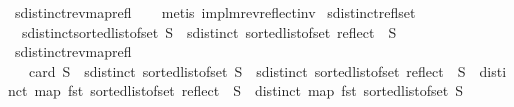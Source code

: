 \begin{isabellebody}
\ sdistinct{\isacharunderscore}{\kern0pt}rev{\isacharunderscore}{\kern0pt}map{\isacharunderscore}{\kern0pt}refl{}\isanewline
\ \ \isamarkupfalse%
\ {\isacharparenleft}{\kern0pt}metis\ implm{\isacharunderscore}{\kern0pt}rev{\isacharunderscore}{\kern0pt}reflect{\isacharunderscore}{\kern0pt}inv{\isacharparenright}{\kern0pt}%
\endisatagproof
{\isafoldproof}%
%
\isadelimproof
\isanewline
%
\endisadelimproof
\isanewline
{}\isamarkupfalse%
\ sdistinct{\isacharunderscore}{\kern0pt}refl{\isacharunderscore}{\kern0pt}set{\isacharcolon}{\kern0pt}\isanewline
\ \ {\isachardoublequoteopen}sdistinct{\isacharparenleft}{\kern0pt}sorted{\isacharunderscore}{\kern0pt}list{\isacharunderscore}{\kern0pt}of{\isacharunderscore}{\kern0pt}set\ S{\isacharparenright}{\kern0pt}\ {\isasymlongleftrightarrow}\ sdistinct\ {\isacharparenleft}{\kern0pt}sorted{\isacharunderscore}{\kern0pt}list{\isacharunderscore}{\kern0pt}of{\isacharunderscore}{\kern0pt}set\ {\isacharparenleft}{\kern0pt}reflect\ {\isacharbackquote}{\kern0pt}\ S{\isacharparenright}{\kern0pt}{\isacharparenright}{\kern0pt}{\isachardoublequoteclose}\isanewline
%
\isadelimproof
\ \ %
\endisadelimproof
%
\isatagproof
{}\isamarkupfalse%
\ sdistinct{\isacharunderscore}{\kern0pt}rev{\isacharunderscore}{\kern0pt}map{\isacharunderscore}{\kern0pt}refl\isanewline
{}\isamarkupfalse%
\ {\isacharminus}{\kern0pt}\isanewline
\ \ \isamarkupfalse%
\ {\isachardoublequoteopen}{}\ {\isacharequal}{\kern0pt}\ card\ S\ {\isasymlongrightarrow}\ sdistinct\ {\isacharparenleft}{\kern0pt}sorted{\isacharunderscore}{\kern0pt}list{\isacharunderscore}{\kern0pt}of{\isacharunderscore}{\kern0pt}set\ S{\isacharparenright}{\kern0pt}\ {\isacharequal}{\kern0pt}\ sdistinct\ {\isacharparenleft}{\kern0pt}sorted{\isacharunderscore}{\kern0pt}list{\isacharunderscore}{\kern0pt}of{\isacharunderscore}{\kern0pt}set\ {\isacharparenleft}{\kern0pt}reflect\ {\isacharbackquote}{\kern0pt}\ S{\isacharparenright}{\kern0pt}{\isacharparenright}{\kern0pt}\ {\isasymor}\ distinct\ {\isacharparenleft}{\kern0pt}map\ fst\ {\isacharparenleft}{\kern0pt}sorted{\isacharunderscore}{\kern0pt}list{\isacharunderscore}{\kern0pt}of{\isacharunderscore}{\kern0pt}set\ {\isacharparenleft}{\kern0pt}reflect\ {\isacharbackquote}{\kern0pt}\ S{\isacharparenright}{\kern0pt}{\isacharparenright}{\kern0pt}{\isacharparenright}{\kern0pt}\ {\isasymand}\ distinct\ {\isacharparenleft}{\kern0pt}map\ fst\ {\isacharparenleft}{\kern0pt}sorted{\isacharunderscore}{\kern0pt}list{\isacharunderscore}{\kern0pt}of{\isacharunderscore}{\kern0pt}set\ S{\isacharparenright}{\kern0pt}{\isacharparenright}{\kern0pt}{\isachardoublequoteclose}\isanewline

\end{isabellebody}
